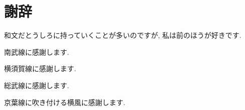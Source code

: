 \chapter*{謝辞}

和文だとうしろに持っていくことが多いのですが, 
私は前のほうが好きです. 


南武線に感謝します. 

横須賀線に感謝します. 

総武線に感謝します. 

京葉線に吹き付ける横風に感謝します. 
